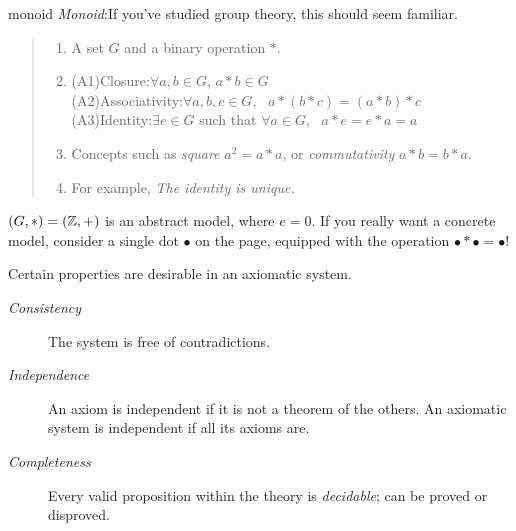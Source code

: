 \begin{example}{}{monoid}
	\emph{Monoid}:\lstsp If you've studied group theory, this should seem familiar.\vspace{-5pt}
	\begin{quote}
		\begin{enumerate}
		  \item A set $G$ and a binary operation $\ast$.
		  \item (A1)\lstsp Closure:\quad $\forall a,b\in G$, $a\ast b\in G$\\
	  	\lstsp(A2)\lstsp Associativity:\quad $\forall a,b,c\in G$, \ $a\ast(b\ast c)=(a\ast b)\ast c$\\
	  	\lstsp(A3)\lstsp Identity:\quad $\exists e\in G$ such that $\forall a\in G$, \ $a\ast e=e\ast a=a$
		  \item Concepts such as \emph{square} $a^2=a\ast a$, or \emph{commutativity} $a\ast b=b\ast a$.
		  \item For example, \emph{The identity is unique.}
		\end{enumerate}
	\end{quote}
	$(G,*)=(\mathbb{Z},+)$ is an abstract model, where $e=0$. If you really want a concrete model, consider a single dot $\bullet$ on the page, equipped with the operation $\bullet *\bullet =\bullet$!
\end{example}


\goodbreak



\begin{defn}{}{}
	Certain properties are desirable in an axiomatic system.
	\begin{description}
		\item[\normalfont\emph{Consistency}] The system is free of contradictions.
		\item[\normalfont\emph{Independence}] An axiom is independent if it is not a theorem of the others. An axiomatic system is independent if all its axioms are. 
		\item[\normalfont\emph{Completeness}] Every valid proposition within the theory is \emph{decidable}; can be proved or disproved.
	\end{description}
\end{defn}

